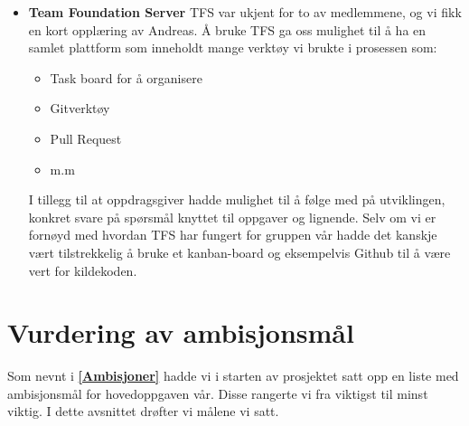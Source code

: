 \begin{itemize}
        
    \item \textbf{Team Foundation Server}
        \newline TFS var ukjent for to av medlemmene, og vi fikk en kort opplæring av Andreas. Å bruke TFS ga oss mulighet til å ha en samlet plattform som inneholdt mange verktøy vi brukte i prosessen som:
        \begin{itemize}
            \item Task board for å organisere
            \item Gitverktøy
            \item Pull Request
            \item m.m
        \end{itemize}
        I tillegg til at oppdragsgiver hadde mulighet til å følge med på utviklingen, konkret svare på spørsmål knyttet til oppgaver og lignende. Selv om vi er fornøyd med hvordan TFS har fungert for gruppen vår hadde det kanskje vært tilstrekkelig å bruke et kanban-board og eksempelvis Github til å være vert for kildekoden.  
    
    
\end{itemize}

\section{\textbf{Vurdering av ambisjonsmål}}
Som nevnt i \textbf{\ref{Ambisjoner}} hadde vi i starten av prosjektet satt opp en liste med ambisjonsmål for hovedoppgaven vår. Disse rangerte vi fra viktigst til minst viktig. I dette avsnittet drøfter vi målene vi satt.

